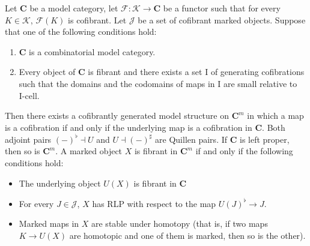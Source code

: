 \documentclass[reqno]{amsart}
\theoremstyle{definition}
\theoremstyle{remark}
\newcommand{\cat}[1]{\mathbf{#1}}
\newcommand{\C}{\cat{C}}
\newcommand{\I}{\mathrm{I}}
\newcommand{\class}[2]{#1\text{-}\mathrm{#2}}
\newcommand{\Icell}[1][\I]{\class{#1}{cell}}
\numberwithin{figure}{section}
\begin{document}
\begin{thm}
Let $\C$ be a model category, let $\mathcal{F} : \mathcal{K} \to \C$ be a functor such that for every $K \in \mathcal{K}$, $\mathcal{F}(K)$ is cofibrant.
Let $\mathcal{J}$ be a set of cofibrant marked objects.
Suppose that one of the following conditions hold:
\begin{enumerate}
\item \label{it:comb} $\C$ is a combinatorial model category.
\item \label{it:all-fib} Every object of $\C$ is fibrant and there exists a set $\I$ of generating cofibrations such that
the domains and the codomains of maps in $\I$ are small relative to $\Icell$.
\end{enumerate}
Then there exists a cofibrantly generated model structure on $\C^m$ in which a map is a cofibration if and only if the underlying map is a cofibration in $\C$.
Both adjoint pairs $(-)^\flat \dashv U$ and $U \dashv (-)^\sharp$ are Quillen pairs.
If $\C$ is left proper, then so is $\C^m$.
A marked object $X$ is fibrant in $\C^m$ if and only if the following conditions hold:
\begin{itemize}
\item The underlying object $U(X)$ is fibrant in $\C$
\item For every $J \in \mathcal{J}$, $X$ has RLP with respect to the map $U(J)^\flat \to J$.
\item Marked maps in $X$ are stable under homotopy (that is, if two maps $K \to U(X)$ are homotopic and one of them is marked, then so is the other).
\end{itemize}
\end{thm}
\end{document}
